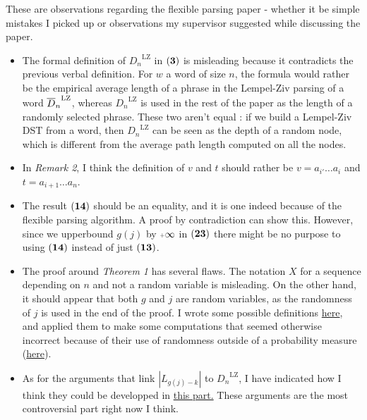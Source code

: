 \label{app:corrections}
These are observations regarding the flexible parsing paper - whether
it be simple mistakes I picked up or observations my supervisor suggested while
discussing the paper.

\begin{itemize}

\item The formal definition of ${D_n}^{\text{LZ}}$ in $\mathbf{(3)}$ is 
      misleading because it contradicts the previous verbal definition.
      For $w$ a word of size $n$, the formula
      would rather be the empirical average length of a phrase in the Lempel-Ziv
      parsing of a word ${\overline{D}_n}^{\text{LZ}}$, whereas
      ${D_n}^{\text{LZ}}$ is used in the rest of the paper as the length
      of a randomly selected phrase. These two aren't equal :
      if we build a Lempel-Ziv DST from a word, then 
      ${D_n}^{\text{LZ}}$ can be seen as the depth of a random node, 
      which is different from the average path length computed 
      on all the nodes. 

\item In \emph{Remark 2}, I think the definition of $v$ and 
      $t$ should rather be 
      $ v = a_{i'} \dots a_{i} $ and
      $ t = a_{i+1} \dots a_n$. 

\item The result $\mathbf{(14)}$ should be an equality, and it is one indeed
      because of the flexible parsing algorithm. A proof by contradiction
      can show this. However, since we upperbound $g(j)$ by $\pinf$ in 
      $\mathbf{(23)}$ there might be no purpose to using $\mathbf{(14)}$ 
      instead of just $\mathbf{(13)}$. 

\item The proof around \emph{Theorem 1} has several flaws.
      The notation $X$ for a sequence depending on $n$ and not a 
      random variable is misleading. On the other hand, it should appear
      that both $g$ and $j$ are random variables, as the randomness of 
      $j$ is used in the end of the proof.
      I wrote some possible definitions \hyperlink{definitions}{here},
      and applied them to make some computations that seemed otherwise
      incorrect because of their use of randomness outside of a probability
      measure (\hyperlink{computations}{here}).

\item As for the arguments that 
      link $|L_{g(j)-k}|$ to ${D_n}^{\text{LZ}}$, I have
      indicated how I think they could be developped in 
      \hyperlink{critics}{this part.} These arguments
      are the most controversial part right now I think.


\end{itemize}
